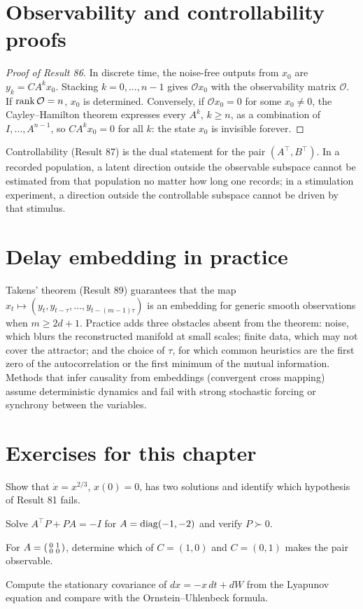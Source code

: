 \section{Observability and controllability proofs}
\begin{proof}[Proof of Result 86]
In discrete time, the noise-free outputs from $x_0$ are
$y_k=CA^kx_0$. Stacking $k=0,\ldots,n-1$ gives $\mathcal Ox_0$ with the
observability matrix $\mathcal O$. If $\operatorname{rank}\mathcal O=n$, $x_0$ is
determined. Conversely, if $\mathcal Ox_0=0$ for some $x_0\ne0$, the
Cayley--Hamilton theorem expresses every $A^k$, $k\ge n$, as a
combination of $I,\ldots,A^{n-1}$, so $CA^kx_0=0$ for all $k$: the
state $x_0$ is invisible forever.
\end{proof}
Controllability (Result 87) is the dual statement for the pair
$(A^\top,B^\top)$. In a recorded population, a latent direction outside
the observable subspace cannot be estimated from that population no
matter how long one records; in a stimulation experiment, a direction
outside the controllable subspace cannot be driven by that stimulus.

\section{Delay embedding in practice}
Takens' theorem (Result 89) guarantees that the map
$x_t\mapsto(y_t,y_{t-\tau},\ldots,y_{t-(m-1)\tau})$ is an embedding for
generic smooth observations when $m\ge2d+1$. Practice adds three
obstacles absent from the theorem: noise, which blurs the reconstructed
manifold at small scales; finite data, which may not cover the
attractor; and the choice of $\tau$, for which common heuristics are the
first zero of the autocorrelation or the first minimum of the mutual
information. Methods that infer causality from embeddings (convergent
cross mapping) assume deterministic dynamics and fail with strong
stochastic forcing or synchrony between the variables.

\section*{Exercises for this chapter}
\begin{exercise}
Show that $\dot x=x^{2/3}$, $x(0)=0$, has two solutions and identify
which hypothesis of Result 81 fails.
\end{exercise}
\begin{exercise}
Solve $A^\top P+PA=-I$ for $A=\operatorname{diag}(-1,-2)$ and verify $P\succ0$.
\end{exercise}
\begin{exercise}
For $A=\begin{psmallmatrix}0&1\\0&0\end{psmallmatrix}$, determine which
of $C=(1,0)$ and $C=(0,1)$ makes the pair observable.
\end{exercise}
\begin{exercise}
Compute the stationary covariance of $dx=-x\,dt+dW$ from the Lyapunov
equation and compare with the Ornstein--Uhlenbeck formula.
\end{exercise}
